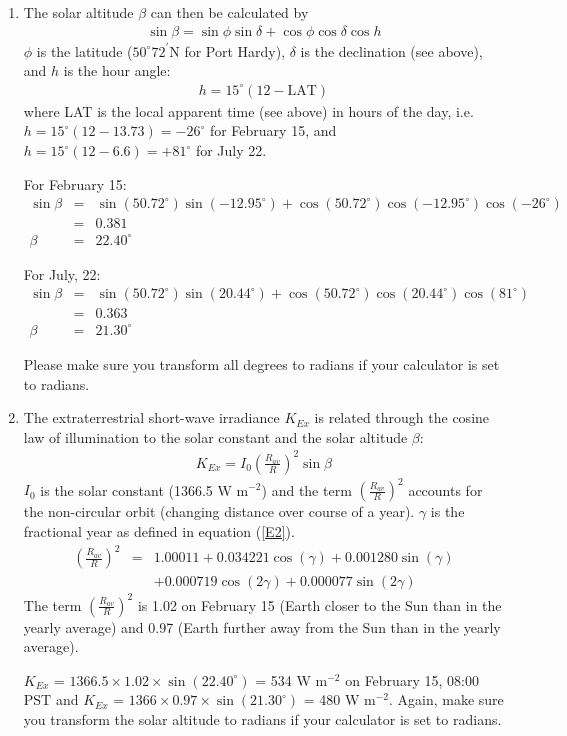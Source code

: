 \documentclass[11pt]{article}
\begin{document}
\begin{enumerate}
\item The solar altitude $\beta$ can then be calculated by
\begin{eqnarray*}
\sin \beta = \sin \phi \sin \delta + \cos \phi \cos \delta \cos h
\end{eqnarray*}
$\phi$ is the latitude ($50^{\circ}72^{\prime}$N for Port Hardy), $\delta$ is the declination (see above), and $h$ is the hour angle:
\begin{eqnarray*}
h = 15^{\circ} (12 - \textrm{LAT})
\end{eqnarray*}
where LAT is the local apparent time (see above) in hours of the day, i.e. $h = 15^{\circ} (12 - 13.73) = -26^{\circ} $ for February 15, and $h = 15^{\circ} (12 - 6.6) = +81^{\circ}$ for July 22. 

For February 15:
\begin{eqnarray*}
\sin \beta &=& \sin (50.72^{\circ}) \sin (-12.95^{\circ}) + \cos (50.72^{\circ})  \cos (-12.95^{\circ}) \cos (-26^{\circ}) \\ &=& 0.381 \\
\beta &=& 22.40^{\circ}
\end{eqnarray*}

For July, 22:
\begin{eqnarray*}
\sin \beta &=& \sin (50.72^{\circ}) \sin (20.44^{\circ}) + \cos (50.72^{\circ})  \cos (20.44^{\circ}) \cos (81^{\circ}) \\&=& 0.363 \\
\beta &=& 21.30^{\circ}
\end{eqnarray*}

Please make sure you transform all degrees to radians if your calculator is set to radians.

\item The extraterrestrial short-wave irradiance $K_{Ex}$ is related through the cosine law of illumination to the solar constant and the solar altitude $\beta$:
\begin{eqnarray*}
K_{Ex} = I_0  \left( \frac{R_{av}}{R} \right)^2 \sin \beta
\end{eqnarray*}
$I_0$ is the solar constant  (1366.5 W m$^{-2}$) and the term $\left( \frac{R_{av}}{R} \right)^2$ accounts for the non-circular orbit (changing distance over course of a year). $\gamma$ is the fractional year as defined in equation (\ref{E2}).
\begin{eqnarray*}
\left( \frac{R_{av}}{R} \right)^2 &=& 1.00011 + 0.034221 \cos(\gamma) + 0.001280  \sin(\gamma) \\
 && + 0.000719  \cos(2 \gamma) + 0.000077  \sin( 2 \gamma)
\end{eqnarray*}
The term $\left( \frac{R_{av}}{R} \right)^2$ is 1.02 on February 15 (Earth closer to the Sun than in the yearly average) and 0.97 (Earth further away from the Sun than in the yearly average).

$K_{Ex}$ = $1366.5 \times 1.02 \times \sin(22.40^{\circ})$ = 534 W m$^{-2}$ on February 15, 08:00 PST and $K_{Ex}$ = $1366 \times 0.97 \times \sin(21.30^{\circ})$ = 480 W m$^{-2}$. Again, make sure you transform the solar altitude to radians if your calculator is set to radians.

\end{enumerate}
\end{document}
